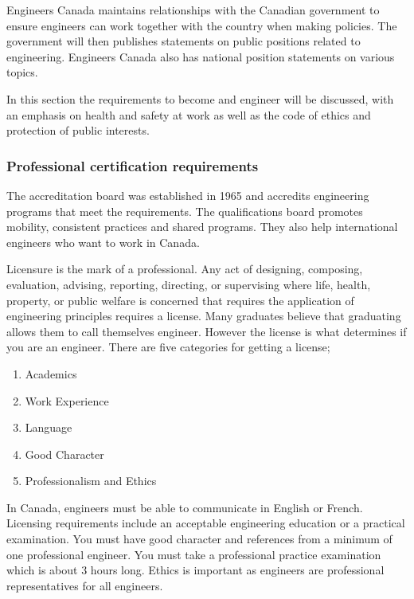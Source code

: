 \documentclass[12pt,a4paper]{report}
\begin{document}
    Engineers Canada maintains relationships with the Canadian government to ensure engineers can work together with the country when making policies. The government will then publishes statements on public positions related to engineering. Engineers Canada also has national position statements on various topics.

\par

    In this section the requirements to become and engineer will be discussed, with an emphasis on health and safety at work as well as the code of ethics and protection of public interests.




    \subsubsection{Professional certification requirements}
    
   
    
    The accreditation board was established in 1965 and accredits engineering programs that meet the requirements. The qualifications board promotes mobility, consistent practices and shared programs. They also help international engineers who want to work in Canada.\par
    
    Licensure is the mark of a professional. Any act of designing, composing, evaluation, advising, reporting, directing, or supervising where life, health, property, or public welfare is concerned that requires the application of engineering principles requires a license. Many graduates believe that graduating allows them to call themselves engineer. However the license is what determines if you are an engineer. There are five categories for getting a license;
    
    \begin{enumerate}
        \item Academics
        \item Work Experience
        \item Language
        \item Good Character
        \item Professionalism and Ethics
    \end{enumerate}
    
    In Canada, engineers must be able to communicate in English or French.  Licensing requirements include an acceptable engineering education or a practical examination. You must have good character and references from a minimum of one professional engineer. You must take a professional practice examination which is about 3 hours long. Ethics is important as engineers are professional representatives for all engineers.\par
    
\end{document}
